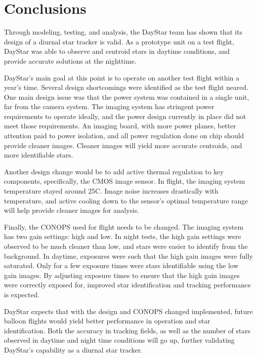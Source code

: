 \documentclass[twocolumn,letterpaper]{IEEEAerospace2012}
\begin{document}
\section{Conclusions}
Through modeling, testing, and analysis, the DayStar team has shown that its design of a diurnal star tracker is valid. As a prototype unit on a test flight, DayStar was able to observe and centroid stars in daytime conditions, and provide accurate solutions at the nighttime. 

DayStar's main goal at this point is to operate on another test flight within a year's time. Several design shortcomings were identified as the test flight neared. One main design issue was that the power system was contained in a single unit, far from the camera system. The imaging system has stringent power requirements to operate ideally, and the power design currently in place did not meet those requirements. An imaging board, with more power planes, better attention paid to power isolation, and all power regulation done on chip should provide cleaner images. Cleaner images will yield more accurate centroids, and more identifiable stars. 

Another design change would be to add active thermal regulation to key components, specifically, the CMOS image sensor. In flight, the imaging system temperature stayed around 25C. Image noise increases drastically with temperature, and active cooling down to the sensor's optimal temperature range will help provide cleaner images for analysis. 

Finally, the CONOPS used for flight needs to be changed. The imaging system has two gain settings: high and low. In night tests, the high gain settings were observed to be much cleaner than low, and stars were easier to identify from the background. In daytime, exposures were such that the high gain images were fully saturated. Only for a few exposure times were stars identifiable using the low gain images. By adjusting exposure times to ensure that the high gain images were correctly exposed for, improved star identification and tracking performance is expected. 

DayStar expects that with the design and CONOPS changed implemented, future balloon flights would yield better performance in operation and star identification. Both the accuracy in tracking fields, as well as the number of stars observed in daytime and night time conditions will go up, further validating DayStar's capability as a diurnal star tracker.  
\end{document}
